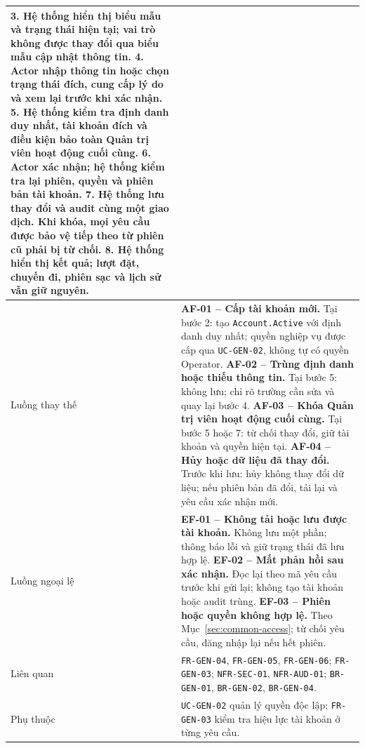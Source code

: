 \begin{longtable}{|L{26mm}|L{118mm}|}
\textbf{3.} Hệ thống hiển thị biểu mẫu và trạng thái hiện tại; vai trò không được thay đổi qua biểu mẫu cập nhật thông tin.\newline
\textbf{4.} Actor nhập thông tin hoặc chọn trạng thái đích, cung cấp lý do và xem lại trước khi xác nhận.\newline
\textbf{5.} Hệ thống kiểm tra định danh duy nhất, tài khoản đích và điều kiện bảo toàn Quản trị viên hoạt động cuối cùng.\newline
\textbf{6.} Actor xác nhận; hệ thống kiểm tra lại phiên, quyền và phiên bản tài khoản.\newline
\textbf{7.} Hệ thống lưu thay đổi và audit cùng một giao dịch. Khi khóa, mọi yêu cầu được bảo vệ tiếp theo từ phiên cũ phải bị từ chối.\newline
\textbf{8.} Hệ thống hiển thị kết quả; lượt đặt, chuyến đi, phiên sạc và lịch sử vẫn giữ nguyên.\\\hline
  Luồng thay thế & \textbf{AF-01 -- Cấp tài khoản mới.} Tại bước 2: tạo \texttt{Account.Active} với định danh duy nhất; quyền nghiệp vụ được cấp qua \texttt{UC-\texttt{GEN}-02}, không tự có quyền Operator.\newline
\textbf{AF-02 -- Trùng định danh hoặc thiếu thông tin.} Tại bước 5: không lưu; chỉ rõ trường cần sửa và quay lại bước 4.\newline
\textbf{AF-03 -- Khóa Quản trị viên hoạt động cuối cùng.} Tại bước 5 hoặc 7: từ chối thay đổi, giữ tài khoản và quyền hiện tại.\newline
\textbf{AF-04 -- Hủy hoặc dữ liệu đã thay đổi.} Trước khi lưu: hủy không thay đổi dữ liệu; nếu phiên bản đã đổi, tải lại và yêu cầu xác nhận mới.\\\hline
  Luồng ngoại lệ & \textbf{EF-01 -- Không tải hoặc lưu được tài khoản.} Không lưu một phần; thông báo lỗi và giữ trạng thái đã lưu hợp lệ.\newline
\textbf{EF-02 -- Mất phản hồi sau xác nhận.} Đọc lại theo mã yêu cầu trước khi gửi lại; không tạo tài khoản hoặc audit trùng.\newline
  \textbf{EF-03 -- Phiên hoặc quyền không hợp lệ.} Theo Mục~\ref{sec:common-access}; từ chối yêu cầu, đăng nhập lại nếu hết phiên.\\\hline
  Liên quan & \texttt{FR-\texttt{GEN}-04}, \texttt{FR-\texttt{GEN}-05}, \texttt{FR-\texttt{GEN}-06}; \texttt{FR-GEN-03}; \texttt{NFR-SEC-01}, \texttt{NFR-AUD-01}; \texttt{BR-\texttt{GEN}-01}, \texttt{BR-\texttt{GEN}-02}, \texttt{BR-\texttt{GEN}-04}.\\\hline
  Phụ thuộc & \texttt{UC-\texttt{GEN}-02} quản lý quyền độc lập; \texttt{FR-\texttt{GEN}-03} kiểm tra hiệu lực tài khoản ở từng yêu cầu.\\\hline
\end{longtable}
\normalsize

